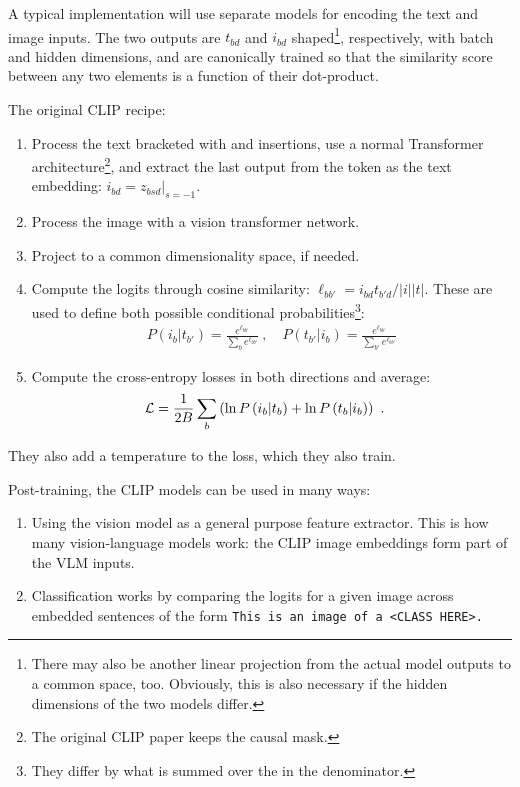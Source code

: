 A typical implementation will use separate models for encoding the text and image inputs. The two
outputs are $ t _{ bd } $ and $ i _{ bd } $ shaped\footnote{There may also be another linear
projection from the actual model outputs to a common space, too. Obviously, this is also necessary
if the hidden dimensions of the two models differ.}, respectively, with batch and hidden dimensions,
and are canonically trained so that the similarity score between any two elements is a function of
their dot-product.

The original CLIP recipe:
\begin{enumerate}
    \item Process the text bracketed with \pyinline{[SOS]} and \pyinline{[EOS]} insertions, use a
        normal Transformer architecture\footnote{The original CLIP paper keeps the causal mask.},
        and extract the last output from the \pyinline{[EOS]} token as the text embedding: $ i _{ bd
        }= z _{ bsd }\big|_{ s=-1 } $.
    \item Process the image with a vision transformer network.
    \item Project to a common dimensionality space, if needed.
    \item Compute the logits through cosine similarity: $ \ell _{ b b' } = i _{ bd }t _{ b'd }/ |i||t| $. These are used to
        define both possible conditional probabilities\footnote{They differ by what is summed over the in the denominator.}:
        \begin{align}
         P(i_b|t _{ b' }) =  \frac{ e ^{ \ell _{b b'} } }{ \sum _{ b  } e ^{ \ell _{b b'} } }  \ ,
         \quad P(t _{ b' }| i _{ b }) =  \frac{ e ^{ \ell _{b b'} } }{ \sum _{ b' }  e ^{ \ell _{b b'} } }
        \end{align}
    \item Compute the cross-entropy losses in both directions and average:
        \begin{align}
           \mathcal{L}  &= \frac{ 1 }{ 2B }\sum _{ b } \left (\ln P \left ( i_b|t_b \right ) + \ln P \left ( t_b|i_b \right )\right ) \label{eq_clip_loss} \ .
        \end{align}
\end{enumerate}
They also add a temperature to the loss, which they also train.

Post-training, the CLIP models can be used in many ways:
\begin{enumerate}
    \item Using the vision model as a general purpose feature extractor. This is how many
        vision-language models work: the CLIP image embeddings form part of the VLM inputs.
    \item Classification works by comparing the logits for a given image across embedded sentences
        of the form \texttt{This is an image of a <CLASS HERE>.}
\end{enumerate}



